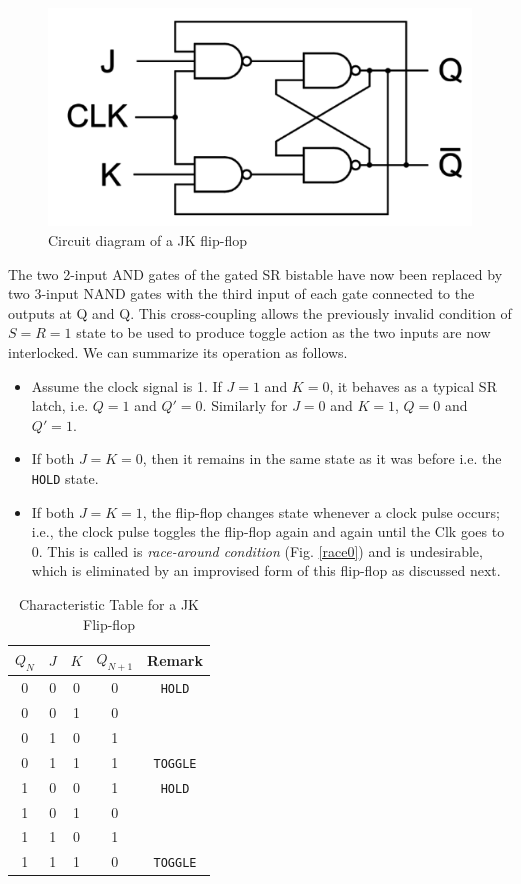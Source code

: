 \begin{figure}[H]
    \centering
    \includegraphics[width=0.70\columnwidth]{images/jk.png}
    \caption{Circuit diagram of a JK flip-flop}
    \label{4}
\end{figure}

The two 2-input AND gates of the gated SR bistable have now been replaced by two 3-input NAND gates with the third input of each gate connected to the outputs at Q and Q. This cross-coupling allows the previously invalid condition of $S=R=1$ state to be used to produce toggle action as the two inputs are now interlocked. We can summarize its operation as follows.

\begin{itemize}
    \item Assume the clock signal is 1. If $J=1$ and $K=0$, it behaves as a typical SR latch, i.e. $Q=1$ and $Q'=0$. Similarly for $J=0$ and $K=1$, $Q=0$ and $Q'=1$.
    \item If both $J=K=0$, then it remains in the same state as it was before i.e. the \verb|HOLD| state.
    \item If both $J=K=1$, the flip-flop changes state whenever a clock
    pulse occurs; i.e., the clock pulse toggles the flip-flop again and again until the Clk goes to 0. This is called is \textit{race-around condition} (Fig. \ref{race0}) and is undesirable, which is eliminated by an improvised form of this flip-flop as discussed next.
\end{itemize}

\begin{table}[H]
    \centering
    \begin{tabular}{|c|c|c|c|c|}\hline
        $Q_N$ & $J$ & $K$ & $Q_{N+1}$ & Remark \\ \hline
        0 & 0 & 0 & 0 & \verb|HOLD| \\ 
        0 & 0 & 1 & 0 & \\ 
        0 & 1 & 0 & 1 &\\ 
        0 & 1 & 1 & 1 & \verb|TOGGLE| \\ 
        1 & 0 & 0 & 1 & \verb|HOLD|\\ 
        1 & 0 & 1 & 0 &\\ 
        1 & 1 & 0 & 1 &\\
        1 & 1 & 1 & 0 & \verb|TOGGLE| \\ \hline
    \end{tabular}
    \caption{Characteristic Table for a JK Flip-flop}
\end{table}

